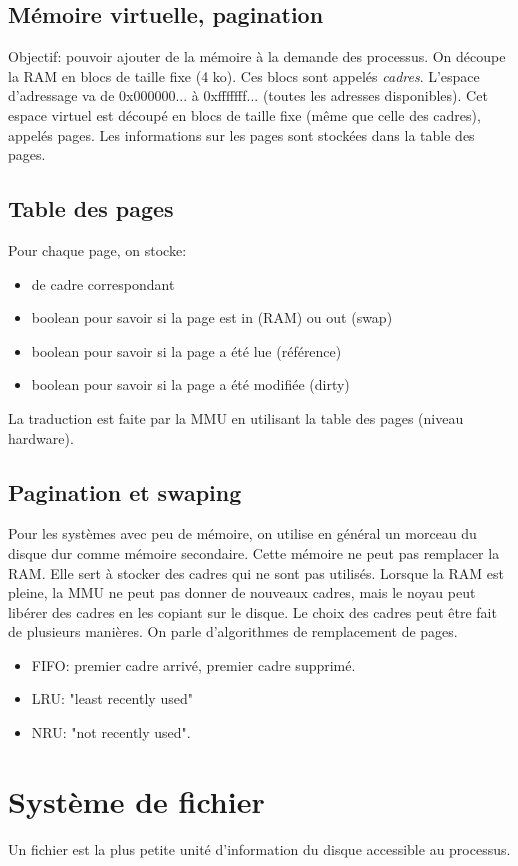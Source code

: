\documentclass[10pt,a4paper]{article}
\begin{document}
		\subsection{Mémoire virtuelle, pagination}
			Objectif: pouvoir ajouter de la mémoire à la demande des processus. On découpe la RAM en blocs de taille fixe (4 ko). Ces blocs sont appelés \emph{cadres}. L'espace d'adressage va de 0x000000... à 0xfffffff... (toutes les adresses disponibles). Cet espace virtuel est découpé en blocs de taille fixe (même que celle des cadres), appelés pages. Les informations sur les pages sont stockées dans la table des pages.
		\subsection{Table des pages}
			Pour chaque page, on stocke:
			\begin{itemize}
				\item \no de cadre correspondant
				\item boolean pour savoir si la page est in (RAM) ou out (swap)
				\item boolean pour savoir si la page a été lue (référence)
				\item boolean pour savoir si la page a été modifiée (dirty)
			\end{itemize}
			La traduction est faite par la MMU en utilisant la table des pages (niveau hardware).
		\subsection{Pagination et swaping}
			Pour les systèmes avec peu de mémoire, on utilise en général un morceau du disque dur comme mémoire secondaire. Cette mémoire ne peut pas remplacer la RAM. Elle sert à stocker des cadres qui ne sont pas utilisés. Lorsque la RAM est pleine, la MMU ne peut pas donner de nouveaux cadres, mais le noyau peut libérer des cadres en les copiant sur le disque. Le choix des cadres peut être fait de plusieurs manières. On parle d'algorithmes de remplacement de pages.
			\begin{itemize}
				\item FIFO: premier cadre arrivé, premier cadre supprimé.
				\item LRU: "least recently used"
				\item NRU: "not recently used".
			\end{itemize}
	\section{Système de fichier}
		Un fichier est la plus petite unité d'information du disque accessible au processus.
\end{document}
